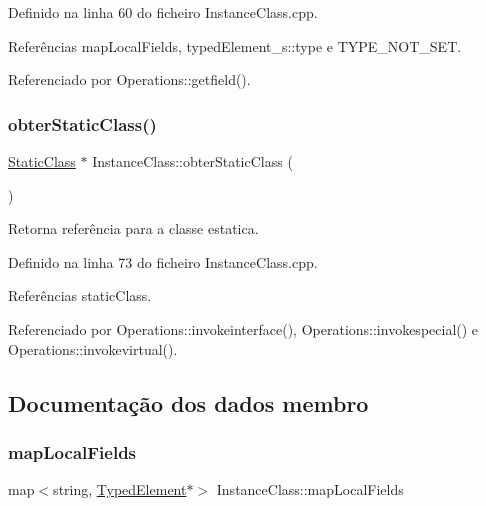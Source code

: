 Definido na linha 60 do ficheiro Instance\+Class.\+cpp.



Referências map\+Local\+Fields, typed\+Element\+\_\+s\+::type e T\+Y\+P\+E\+\_\+\+N\+O\+T\+\_\+\+S\+ET.



Referenciado por Operations\+::getfield().

\mbox{\label{classInstanceClass_a6da567a64a8373d609792821f5acb9a3}} 
\subsubsection{\texorpdfstring{obter\+Static\+Class()}{obterStaticClass()}}
{\footnotesize\ttfamily \hyperlink{classStaticClass}{Static\+Class} $\ast$ Instance\+Class\+::obter\+Static\+Class (\begin{DoxyParamCaption}{ }\end{DoxyParamCaption})}



Retorna referência para a classe estatica. 



Definido na linha 73 do ficheiro Instance\+Class.\+cpp.



Referências static\+Class.



Referenciado por Operations\+::invokeinterface(), Operations\+::invokespecial() e Operations\+::invokevirtual().



\subsection{Documentação dos dados membro}
\mbox{\label{classInstanceClass_a455e05eefc1273e6cf22607c8941e9c0}} 
\subsubsection{\texorpdfstring{map\+Local\+Fields}{mapLocalFields}}
{\footnotesize\ttfamily map$<$string, \hyperlink{BasicTypes_8h_a97b332303b1262282599e6ede0637b82}{Typed\+Element}$\ast$$>$ Instance\+Class\+::map\+Local\+Fields\hspace{0.3cm}{\ttfamily [private]}}



